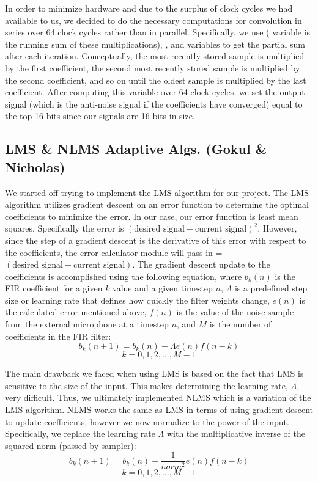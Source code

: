 \documentclass{fpgairpods}
\begin{document}
In order to minimize hardware and due to the surplus of clock cycles we had available to us, we decided to do the necessary computations for convolution in series over 64 clock cycles rather than in parallel. Specifically, we use  ( variable is the running sum of these multiplications), , and  variables to get the partial sum after each iteration. Conceptually, the most recently stored sample is multiplied by the first coefficient, the second most recently stored sample is multiplied by the second coefficient, and so on until the oldest sample is multiplied by the last coefficient. After computing this variable over 64 clock cycles, we set the output signal  (which is the anti-noise signal if the coefficients have converged) equal to the top 16 bits since our signals are 16 bits in size.


\subsection{LMS \& NLMS Adaptive Algs. (Gokul \& Nicholas)}
We started off trying to implement the LMS algorithm for our project. The LMS algorithm utilizes gradient descent on an error function to determine the optimal coefficients to minimize the error. In our case, our error function is least mean squares. Specifically the error is $(\text{desired signal} - \text{current signal})^2$. However, since the step of a gradient descent is the derivative of this error with respect to the coefficients, the error calculator module will pass in  = $(\text{desired signal} - \text{current signal})$. The gradient descent update to the coefficients is accomplished using the following equation\cite{lmsfilter}, where $b_k(n)$ is the FIR coefficient for a given $k$ value and a given timestep $n$, $\Lambda$ is a predefined step size or learning rate that defines how quickly the filter weights change, $e(n)$ is the calculated error mentioned above, $f(n)$ is the value of the noise sample from the external microphone at a timestep $n$, and $M$ is the number of coefficients in the FIR filter:
\[ b_k(n + 1) = b_k(n) + \Lambda e(n)f(n-k) \]
\[ k = 0, 1, 2,\ldots,  M-1 \]

The main drawback we faced when using LMS is based on the fact that LMS is sensitive to the size of the input. This makes determining the learning rate, $\Lambda$, very difficult. Thus, we ultimately implemented NLMS which is a variation of the LMS algorithm. NLMS works the same as LMS in terms of using gradient descent to update coefficients, however we now normalize to the power of the input. Specifically, we replace the learning rate $\Lambda$ with the multiplicative inverse of the squared norm (passed by sampler):
\[ b_k(n + 1) = b_k(n) + \frac{1}{norm^2} e(n)f(n-k) \]
\[ k = 0, 1, 2,\ldots,  M-1 \]
\end{document}
